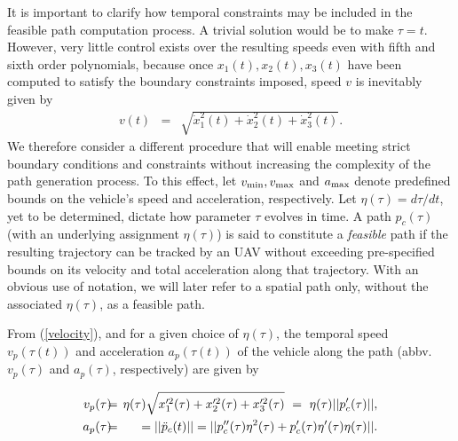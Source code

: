 \documentclass[]{aiaa-tc}%
\begin{document}
It is important to clarify how temporal constraints may be included in the feasible
path computation process. A trivial solution would be to make $\tau=t$. However, very
little control exists over the resulting speeds even with fifth and sixth order
polynomials, because once $x_1(t), x_2(t), x_3(t)$ have been computed to satisfy the
boundary constraints imposed, speed $v$ is inevitably given by
\begin{eqnarray}
\label{velocity} v(t) &=& \sqrt{ \dot{x}_{1}^2(t) +
\dot{x}^2_{2}(t) + \dot{x}^2_{3}(t)}.
\end{eqnarray}
We therefore consider a different procedure that will enable meeting strict boundary
conditions and constraints without increasing the complexity of the path generation
process. To this effect, let $v_{{\rm min}}, v_{{\rm max}}$ and $a_{{\rm max}}$ denote
predefined bounds on the vehicle's speed and acceleration, respectively. Let
$\eta(\tau) = d\tau/dt$, yet to be determined, dictate how parameter $\tau$ evolves in
time. A path $p_c(\tau)$ (with an underlying assignment $\eta(\tau)$) is said to
constitute a \textit{feasible} path if the resulting trajectory can be tracked by an
UAV without exceeding pre-specified bounds on its velocity and total acceleration along
that trajectory. With an obvious use of notation, we will later refer to a spatial path
only, without the associated $\eta(\tau)$, as a feasible path.

From (\ref{velocity}), and for a given choice of $\eta(\tau)$, the temporal
speed $v_p(\tau(t))$ and acceleration $a_p(\tau(t))$ of the vehicle along
the path (abbv. $v_p(\tau)$ and $a_p(\tau)$, respectively) are given by

\begin{eqnarray} \nonumber
v_p(\tau) \hspace{ -0.2 cm} &=& \hspace{ -0.2 cm} \eta(\tau)
\sqrt{x'^2_{1}(\tau) + x'^2_{2}(\tau) + x'^2_{3}(\tau)} ~ = ~
\eta(\tau) ||p'_c(\tau)||, \\
\label{velacc} a_p(\tau) \hspace{ -0.2 cm} &=& \hspace{ -0.2 cm}
=||\ddot{p}_c(t) || = ||p''_c(\tau) \eta^2(\tau) + p'_c(\tau) \eta'(\tau)  \eta(\tau)||.
\end{eqnarray}
\end{document}
